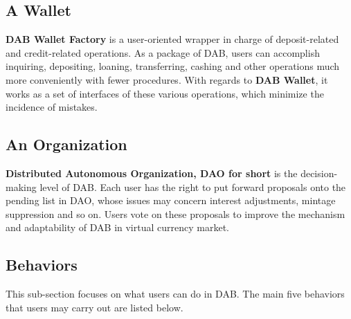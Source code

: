 \documentclass[review]{elsarticle}
\begin{document}
\subsection{A Wallet}
\textbf{DAB Wallet Factory} is a user-oriented wrapper in charge of deposit-related and credit-related operations. As a package of DAB, users can accomplish inquiring, depositing, loaning, transferring, cashing and other operations much more conveniently with fewer procedures. With regards to \textbf{DAB Wallet}, it works as a set of interfaces of these various operations, which minimize the incidence of mistakes.

\subsection{An Organization}
\textbf{Distributed Autonomous Organization, DAO for short} is the decision-making level of DAB. Each user has the right to put forward proposals onto the pending list in DAO, whose issues may concern interest adjustments, mintage suppression and so on. Users vote on these proposals to improve the mechanism and adaptability of DAB in virtual currency market.  

\subsection{Behaviors}
This sub-section focuses on what users can do in DAB. The main five behaviors that users may carry out are listed below.
\end{document}
